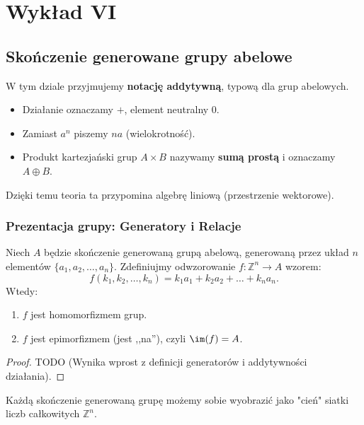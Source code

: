 \chapter{Wykład VI}
\section{Skończenie generowane grupy abelowe}

\begin{context}
    W tym dziale przyjmujemy \textbf{notację addytywną}, typową dla grup abelowych.
    \begin{itemize}
        \item Działanie oznaczamy $+$, element neutralny $0$.
        \item Zamiast $a^n$ piszemy $na$ (wielokrotność).
        \item Produkt kartezjański grup $A \times B$ nazywamy \textbf{sumą prostą} i oznaczamy $A \oplus B$.
    \end{itemize}
    Dzięki temu teoria ta przypomina algebrę liniową (przestrzenie wektorowe).
\end{context}

\subsection{Prezentacja grupy: Generatory i Relacje}

\begin{lemma}
    Niech $A$ będzie skończenie generowaną grupą abelową, generowaną przez układ $n$ elementów $\{a_1, a_2, \ldots, a_n\}$.
    Zdefiniujmy odwzorowanie $f: \mathbb{Z}^n \to A$ wzorem:
    \[
        f(k_1, k_2, \ldots, k_n) = k_1 a_1 + k_2 a_2 + \ldots + k_n a_n.
    \]
    Wtedy:
    \begin{enumerate}[label=\arabic*.]
        \item $f$ jest homomorfizmem grup.
        \item $f$ jest epimorfizmem (jest ,,na''), czyli $\im(f) = A$.
    \end{enumerate}
\end{lemma}
\begin{proof}
    TODO (Wynika wprost z definicji generatorów i addytywności działania).
\end{proof}

Każdą skończenie generowaną grupę możemy sobie wyobrazić jako "cień" siatki liczb całkowitych $\mathbb{Z}^n$.

